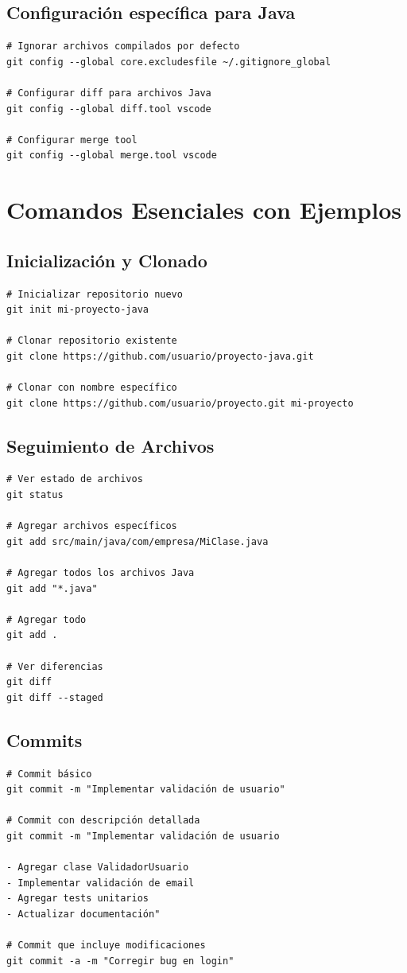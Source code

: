 \documentclass[12pt,a4paper]{article}
\begin{document}
\subsection{Configuración específica para Java}
\begin{lstlisting}[caption=Configuraciones útiles para desarrollo Java]
# Ignorar archivos compilados por defecto
git config --global core.excludesfile ~/.gitignore_global

# Configurar diff para archivos Java
git config --global diff.tool vscode

# Configurar merge tool
git config --global merge.tool vscode
\end{lstlisting}

\section{Comandos Esenciales con Ejemplos}

\subsection{Inicialización y Clonado}
\begin{lstlisting}[caption=Crear y clonar repositorios]
# Inicializar repositorio nuevo
git init mi-proyecto-java

# Clonar repositorio existente
git clone https://github.com/usuario/proyecto-java.git

# Clonar con nombre específico
git clone https://github.com/usuario/proyecto.git mi-proyecto
\end{lstlisting}

\subsection{Seguimiento de Archivos}
\begin{lstlisting}[caption=Gestión de archivos]
# Ver estado de archivos
git status

# Agregar archivos específicos
git add src/main/java/com/empresa/MiClase.java

# Agregar todos los archivos Java
git add "*.java"

# Agregar todo
git add .

# Ver diferencias
git diff
git diff --staged
\end{lstlisting}

\subsection{Commits}
\begin{lstlisting}[caption=Creación de commits]
# Commit básico
git commit -m "Implementar validación de usuario"

# Commit con descripción detallada
git commit -m "Implementar validación de usuario

- Agregar clase ValidadorUsuario
- Implementar validación de email
- Agregar tests unitarios
- Actualizar documentación"

# Commit que incluye modificaciones
git commit -a -m "Corregir bug en login"
\end{lstlisting}
\end{document}
